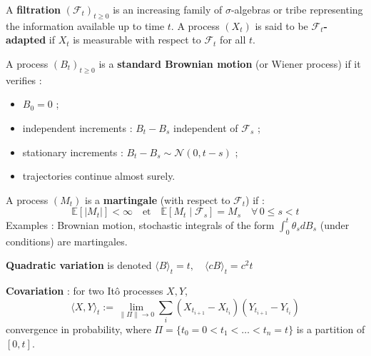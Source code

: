 \begin{f}
	
A \textbf{filtration} $(\mathcal{F}_t)_{t \geq 0}$ is an increasing family of $\sigma$-algebras or tribe representing the information available up to time $t$. A process $(X_t)$ is said to be \textbf{$\mathcal{F}_t$-adapted} if $X_t$ is measurable with respect to $\mathcal{F}_t$ for all $t$.
	
A process $(B_t)_{t \geq 0}$ is a \textbf{standard Brownian motion} (or Wiener process) if it verifies :
	\begin{itemize} 
		\item $B_0 = 0$ ;
		\item independent increments : $B_t - B_s$  independent of $\mathcal{F}_s$ ;
		\item stationary increments : $B_t - B_s \sim \mathcal{N}(0, t - s)$ ;
		\item trajectories continue almost surely.
	\end{itemize}
	
	A process $(M_t)$ is a \textbf{martingale} (with respect to $\mathcal{F}_t$) if :
	\[
	\mathbb{E}[|M_t|] < \infty \quad \text{et} \quad \mathbb{E}[M_t \mid \mathcal{F}_s] = M_s \quad \forall\, 0 \leq s < t
	\]
	Examples : Brownian motion, stochastic integrals of the form $\int_0^t \theta_s dB_s$ (under conditions) are martingales.
	\medskip
	
	\textbf{Quadratic variation} is denoted $
	\langle B \rangle_t = t, \quad \langle cB \rangle_t = c^2 t$
	
\textbf{Covariation} : for two Itô processes $X, Y$,
\[
\langle X, Y \rangle_t := \lim_{\|\Pi\| \to 0} \sum_{i} (X_{t_{i+1}} - X_{t_i})(Y_{t_{i+1}} - Y_{t_i})
\]
convergence in probability, where $\Pi = \{t_0 = 0 < t_1 < \dots < t_n = t\}$ is a partition of $[0,t]$.
\end{f}


